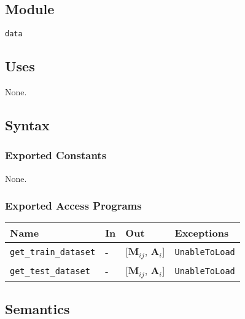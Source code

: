 \documentclass[12pt, titlepage]{article}
\def\code#1{\texttt{#1}}
\begin{document}
\subsection{Module}
\code{data} 

\subsection{Uses}
None.

\subsection{Syntax}
\subsubsection{Exported Constants}
None.

\subsubsection{Exported Access Programs}

\begin{center}
\begin{tabular}{p{3.5cm} p{4cm} p{6cm} p{2cm}}
\hline
\textbf{Name} & \textbf{In} & \textbf{Out} & \textbf{Exceptions} \\
\hline
\code{get\_train\_dataset} & - & [$\mathbf{M}_{ij}$, $\mathbf{A}_{i}$] & \code{UnableToLoad} \\
\code{get\_test\_dataset} & - & [$\mathbf{M}_{ij}$, $\mathbf{A}_{i}$] & \code{UnableToLoad} \\
\hline
\end{tabular}
\end{center}

\subsection{Semantics}
\end{document}
